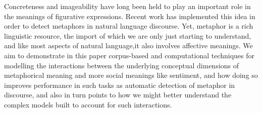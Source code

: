 Concreteness and imageability have long been held to play an important role in the meanings of figurative expressions. Recent work has implemented this idea in order to detect metaphors in natural language discourse. Yet, metaphor is a rich linguistic resource, the import of which we are only just starting to understand, and like most aspects of natural language,it also involves affective meanings. We aim to demonstrate in this paper corpus-based and computational techniques for modelling the interactions between the underlying conceptual dimensions of metaphorical meaning and more social meanings like sentiment, and how doing so improves performance in such tasks as automatic detection of metaphor in discourse, and also in turn points to how we might better understand the complex models built to account for such interactions.
